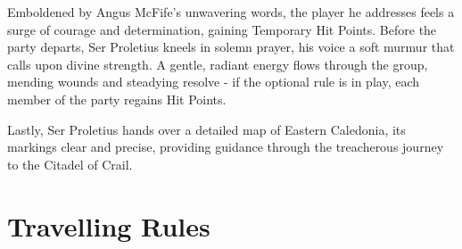 {\noindent\entryfont Emboldened by Angus McFife's unwavering words, the player he addresses feels a surge of courage and determination, gaining  Temporary Hit Points. Before the party departs, Ser Proletius kneels in solemn prayer, his voice a soft murmur that calls upon divine strength. A gentle, radiant energy flows through the group, mending wounds and steadying resolve - if the optional rule is in play, each member of the party regains  Hit Points.

Lastly, Ser Proletius hands over a detailed map of Eastern Caledonia, its markings clear and precise, providing guidance through the treacherous journey to the Citadel of Crail.}

\section*{Travelling Rules}


